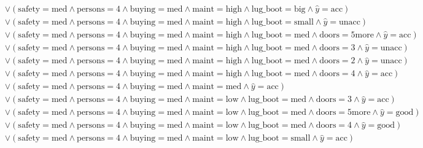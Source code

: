 \begin{scriptsize}
\[\begin{aligned}
  \\ & \lor (\text{safety}=\text{med} \land \text{persons}=\text{4} \land \text{buying}=\text{med} \land \text{maint}=\text{high} \land \text{lug_boot}=\text{big} \land \hat{y}=\text{acc})
  \\ & \lor (\text{safety}=\text{med} \land \text{persons}=\text{4} \land \text{buying}=\text{med} \land \text{maint}=\text{high} \land \text{lug_boot}=\text{small} \land \hat{y}=\text{unacc})
  \\ & \lor (\text{safety}=\text{med} \land \text{persons}=\text{4} \land \text{buying}=\text{med} \land \text{maint}=\text{high} \land \text{lug_boot}=\text{med} \land \text{doors}=\text{5more} \land \hat{y}=\text{acc})
  \\ & \lor (\text{safety}=\text{med} \land \text{persons}=\text{4} \land \text{buying}=\text{med} \land \text{maint}=\text{high} \land \text{lug_boot}=\text{med} \land \text{doors}=\text{3} \land \hat{y}=\text{unacc})
  \\ & \lor (\text{safety}=\text{med} \land \text{persons}=\text{4} \land \text{buying}=\text{med} \land \text{maint}=\text{high} \land \text{lug_boot}=\text{med} \land \text{doors}=\text{2} \land \hat{y}=\text{unacc})
  \\ & \lor (\text{safety}=\text{med} \land \text{persons}=\text{4} \land \text{buying}=\text{med} \land \text{maint}=\text{high} \land \text{lug_boot}=\text{med} \land \text{doors}=\text{4} \land \hat{y}=\text{acc})
  \\ & \lor (\text{safety}=\text{med} \land \text{persons}=\text{4} \land \text{buying}=\text{med} \land \text{maint}=\text{med} \land \hat{y}=\text{acc})
  \\ & \lor (\text{safety}=\text{med} \land \text{persons}=\text{4} \land \text{buying}=\text{med} \land \text{maint}=\text{low} \land \text{lug_boot}=\text{med} \land \text{doors}=\text{3} \land \hat{y}=\text{acc})
  \\ & \lor (\text{safety}=\text{med} \land \text{persons}=\text{4} \land \text{buying}=\text{med} \land \text{maint}=\text{low} \land \text{lug_boot}=\text{med} \land \text{doors}=\text{5more} \land \hat{y}=\text{good})
  \\ & \lor (\text{safety}=\text{med} \land \text{persons}=\text{4} \land \text{buying}=\text{med} \land \text{maint}=\text{low} \land \text{lug_boot}=\text{med} \land \text{doors}=\text{4} \land \hat{y}=\text{good})
  \\ & \lor (\text{safety}=\text{med} \land \text{persons}=\text{4} \land \text{buying}=\text{med} \land \text{maint}=\text{low} \land \text{lug_boot}=\text{small} \land \hat{y}=\text{acc})

\end{aligned}\]
\end{scriptsize}
